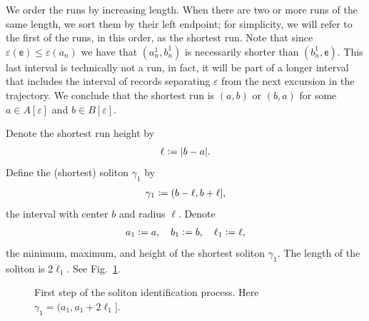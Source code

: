 \documentclass[12pt]{article}
\numberwithin{equation}{section}
\newcommand{\se}{{\mathsf{e}}}
\newcommand{\eps}{\varepsilon}
\begin{document}
We order the runs by increasing length. When there are two or more runs of the same length, we sort them by their left endpoint; for simplicity, we will refer to the first of the runs, in this order, as the shortest run.
Note that since $\eps(\se)\leq \eps(a_n)$ we have that $(a_n^1, b_n^1)$ is necessarily shorter than $(b_n^1,\se)$. This last interval is technically not a run, in fact, it will be part of a longer interval that includes the interval of records separating $\eps$ from the next excursion in the trajectory. 
We conclude that the shortest run is $(a,b)$ or $(b,a)$ for some $a\in A[\eps]$ and $b\in B[\eps]$.

Denote the shortest run height by
\begin{align*}
  \ell\vcentcolon = |b-a|.
\end{align*}
Define the (shortest) soliton $\gamma_1$ by
\begin{gather}
 \label{sol1}
 \gamma_1 \vcentcolon = (b-\ell, b+\ell], 
\end{gather}
the interval with center $b$ and radius $\ell$. Denote
\begin{align}
  a_1\vcentcolon =a, \quad b_1\vcentcolon =b,\quad \ell_1\vcentcolon =\ell,\label{sol3}
\end{align}
the minimum,  maximum, and height of the shortest soliton $\gamma_1$.
The length of the soliton is $2\ell_1$.
See Fig.~\ref{solid1}. 



\begin{figure}[th]
\centering
{}
\caption{First step of the soliton identification process. Here $\gamma_1=(a_1, a_1+2\ell_1]$.}\label{solid1}
\end{figure}
\end{document}
